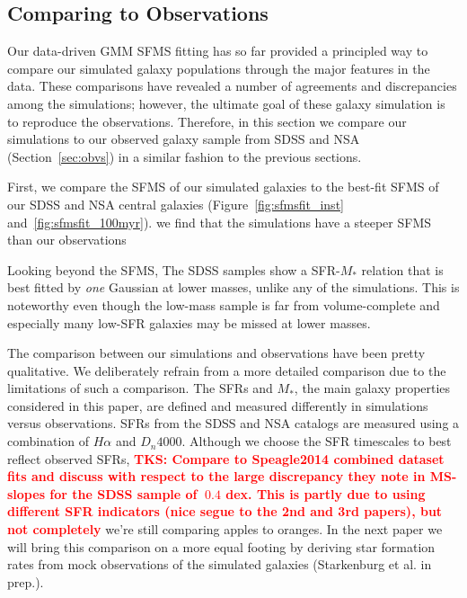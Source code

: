 \documentclass[preprint2,tighten]{aastex62}
\newcommand{\todo}[1]{{\bf \textcolor{red}{ #1}}}
\begin{document}
\subsection{Comparing to Observations}
Our data-driven GMM SFMS fitting has so far provided a principled way to 
compare our simulated galaxy populations through the major features in the 
data. These comparisons have revealed a number of agreements and discrepancies
among the simulations; however, the ultimate goal of these galaxy simulation 
is to reproduce the observations. Therefore, in this section we compare 
our simulations to our observed galaxy sample from SDSS and NSA
(Section~\ref{sec:obvs}) in a similar fashion to the previous sections. 

First, we compare the SFMS of our simulated galaxies to the best-fit SFMS
of our SDSS and NSA central galaxies
(Figure~\ref{fig:sfmsfit_inst} and~\ref{fig:sfmsfit_100myr}). 
we find that the simulations have a steeper SFMS than our observations

Looking beyond the SFMS, 
The SDSS samples show a SFR-$M_*$ relation that is best fitted by \emph{one} Gaussian at lower masses, unlike any of the simulations. This is noteworthy even though the low-mass sample is far from volume-complete and especially many low-SFR galaxies may be missed at lower masses.

The comparison between our simulations and observations have been pretty 
qualitative. We deliberately refrain from a more detailed comparison due 
to the limitations of such a comparison. The SFRs and $M_*$, the main 
galaxy properties considered in this paper, are defined and measured 
differently in simulations versus observations. SFRs from the SDSS and 
NSA catalogs are measured using a combination of $H\alpha$ and $D_n 4000$. 
Although we choose the SFR timescales to best reflect observed SFRs, 
\todo{TKS: Compare to Speagle2014 combined dataset fits and discuss with respect to the large discrepancy they note in MS-slopes for the SDSS sample of $~0.4$ dex. This is partly due to using different SFR indicators (nice segue to the 2nd and 3rd papers), but not completely}
we're still comparing apples to oranges. 
In the next paper we will bring this comparison on a more equal footing 
by deriving star formation rates from mock observations of the simulated 
galaxies (Starkenburg et al. in prep.).
\end{document}
